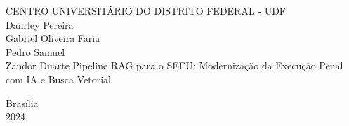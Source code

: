\begin{center}
{\ABNTEXchapterfont\large CENTRO UNIVERSITÁRIO DO DISTRITO FEDERAL - UDF}\\
\vspace{2cm}
{\ABNTEXchapterfont\Large Danrley Pereira \\Gabriel Oliveira Faria\\Pedro Samuel\\Zandor Duarte}
\vspace{3cm}
{\ABNTEXchapterfont\Large Pipeline RAG para o SEEU: Modernização da Execução Penal com IA e Busca Vetorial}
\vspace{6cm}
\end{center}
\begin{flushright}
Brasília\\
2024
\end{flushright}
